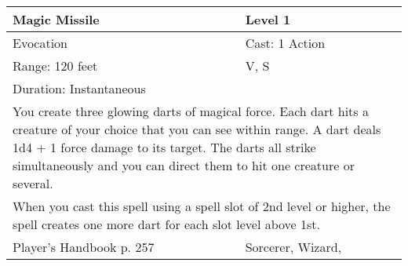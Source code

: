 \documentclass[11pt]{report}
\begin{document}
\begin{table}[H]
	\begin{tabular}{||p{6cm}|p{6cm}||}
		\hline\hline
		\bf{Magic Missile} & Level 1\\ \hline
		Evocation & Cast: 1 Action\\ \hline
		Range: 120 feet & V, S\\ \hline
		Duration: Instantaneous & \\ \hline
		\multicolumn{2}{||p{12cm}||}{You create three glowing darts of magical force. Each dart hits a creature of your choice that you can see within range. A dart deals 1d4 + 1 force damage to its target. The darts all strike simultaneously and you can direct them to hit one creature or several.}\\ \hline
		\multicolumn{2}{||p{12cm}||}{When you cast this spell using a spell slot of 2nd level or higher, the spell creates one more dart for each slot level above 1st.}\\ \hline
Player's Handbook p. 257 & Sorcerer, Wizard, \\ \hline\hline
	\end{tabular}
\end{table}
\end{document}
